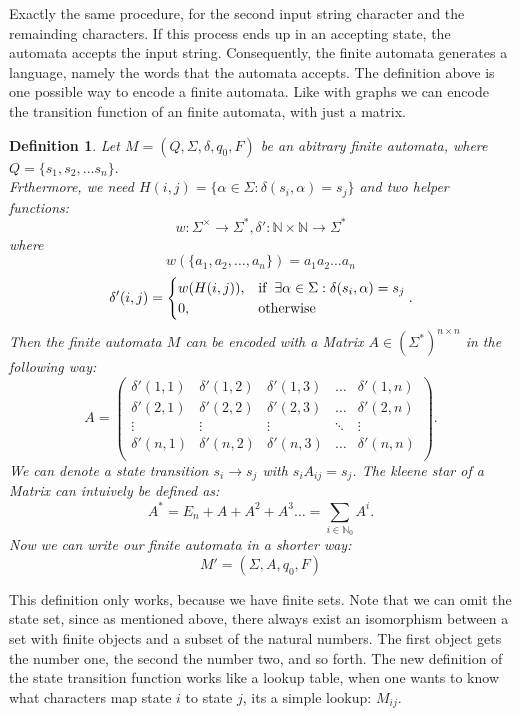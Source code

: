 \documentclass[12pt,letterpaper]{article}
\newtheorem{definition}{Definition}
\begin{document}
Exactly the same procedure, for the second input string character and the 
remainding characters. If this process ends up in an accepting state, 
the automata accepts the input string. Consequently, 
the finite automata generates a language, namely the words that the automata 
accepts. The definition above is one possible way to encode a finite automata. 
Like with graphs we can encode the transition function of an finite
automata, with just a matrix.
\begin{definition}
  Let $M = (Q, \Sigma, \delta, q_0, F)$ be an abitrary finite 
  automata, where $Q = \{ s_1, s_2, \dots s_n\}.$ \\
  Frthermore, we need $H(i,j) = \{ \alpha \in \Sigma : \delta(s_i, \alpha) = s_j\}$
  and two helper functions:
  \[
    w: \Sigma^\times \to \Sigma^*, 
    \delta': \mathbb{N} \times \mathbb{N} \to \Sigma^*
  \]
  where
  \[
    w(\{a_1,a_2,\dots, a_n\}) = a_1a_2\dots a_n
  \]
  \[
    \delta'(i, j) = 
      \begin{cases}
        w(H(i,j)), & \text{if} \hspace{0.2cm} \exists \alpha \in \Sigma: 
          \delta(s_i, \alpha) = s_j \\
        0, & \text{otherwise}
      \end{cases}.
  \]
  Then the finite automata $M$ can be encoded with a Matrix
    $A \in (\Sigma^*)^{n \times n}$
  in the following way:
  \[
    A = 
    \begin{pmatrix}
      \delta'(1,1)       & \delta'(1,2) & \delta'(1,3) & \dots & \delta'(1,n) \\
      \delta'(2,1)       & \delta'(2,2) & \delta'(2,3) & \dots & \delta'(2,n) \\
      \vdots             & \vdots       & \vdots       & \ddots& \vdots\\
      \delta'(n,1)       & \delta'(n,2) & \delta'(n,3) & \dots & \delta'(n,n) \\
    \end{pmatrix}
  .\]
  We can denote a state transition $s_i \to s_j$ with $s_iA_{ij} = s_j$.
  The kleene star of a Matrix can intuively  be defined as:
  \[
    A^* = E_n + A + A^2 + A^3 \dots  = \sum_{i \in \mathbb{N}_0} A^i.
  \]
  Now we can write our finite automata in a shorter way:
  \[
    M' = (\Sigma, A, q_0, F)
  \]
\end{definition}
This definition only works, because we have finite sets. Note that we can omit
the state set, since as mentioned above, there always exist an isomorphism
between a set with finite objects and a subset of the natural numbers. The first
object gets the number one, the second the number two, and so forth. The new
definition of the state transition function works like a lookup table, when one
wants to know what characters map state $i$ to state $j$, its a simple lookup:
$M_{ij}$.
\end{document}

